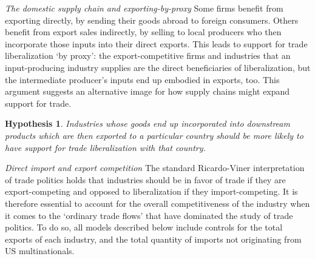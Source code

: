\documentclass[hidelinks,12pt,letter]{article}
\newtheorem{hypo}{Hypothesis}
\begin{document}
\medskip

\noindent \textit{The domestic supply chain and exporting-by-proxy}\; 
Some firms benefit from exporting directly, by sending their goods abroad to foreign consumers. Others benefit from export sales indirectly, by selling to local producers who then incorporate those inputs into their direct exports. This leads to support for trade liberalization `by proxy': the export-competitive firms and industries that an input-producing industry supplies are the direct beneficiaries of liberalization, but the intermediate producer's inputs end up embodied in exports, too. This argument suggests an alternative image for how supply chains might expand support for trade.
\begin{hypo}
Industries whose goods end up incorporated into downstream products which are then exported to a particular country should be more likely to have support for trade liberalization with that country.
\end{hypo}

\smallskip

\noindent \textit{Direct import and export competition}\; The standard Ricardo-Viner interpretation of trade politics holds that industries should be in favor of trade if they are export-competing and opposed to liberalization if they import-competing. It is therefore essential to account for the overall competitiveness of the industry when it comes to the `ordinary trade flows' that have dominated the study of trade politics. To do so, all models described below include controls for the total exports of each industry, and the total quantity of imports not originating from US multinationals. 
\end{document}
